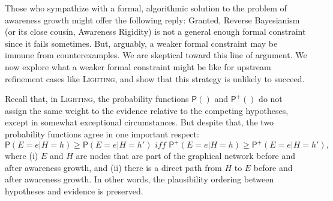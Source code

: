 \documentclass[
  11pt,
  dvipsnames,enabledeprecatedfontcommands]{scrartcl}
\newcommand{\pr}[1]{\ensuremath{\mathsf{P}(#1)}}
\newcommand{\ppr}[2]{\ensuremath{\mathsf{P}^{#1}(#2)}}
\begin{document}
\label{sec:material}

Those who sympathize with a formal, algorithmic solution to the problem
of awareness growth might offer the following reply: Granted, Reverse
Bayesianism (or its close cousin, Awareness Rigidity) is not a general
enough formal constraint since it fails sometimes. But, arguably, a
weaker formal constraint may be immune from counterexamples. We are
skeptical toward this line of argument. We now explore what a weaker
formal constraint might be like for upstream refinement cases like
\textsc{Lighting}, and show that this strategy is unlikely to succeed.

Recall that, in \textsc{Lighting}, the probability functions \(\pr{}\)
and \(\ppr{+}{}\) do not assign the same weight to the evidence relative
to the competing hypotheses, except in somewhat exceptional
circumstances. But despite that, the two probability functions agree in
one important respect:
\[\pr{E=e \vert H=h} \geq \pr{E=e \vert H=h'} \textit{ iff } \ppr{+}{E=e \vert H=h} \geq \ppr{+}{E=e \vert H=h'} \tag{$C^*$},\]
where (i) \(E\) and \(H\) are nodes that are part of the graphical
network before and after awareness growth, and (ii) there is a direct
path from \(H\) to \(E\) before and after awareness growth. In other
words, the plausibility ordering between hypotheses and evidence is
preserved.
\end{document}
